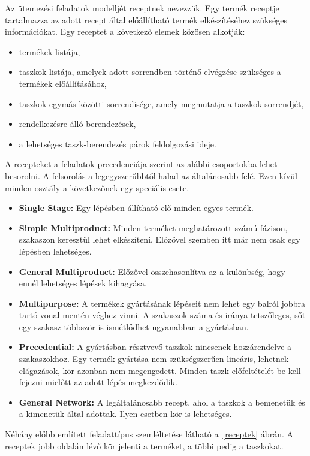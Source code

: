 Az ütemezési feladatok modelljét receptnek nevezzük. Egy termék receptje tartalmazza az adott recept által előállítható termék elkészítéséhez szükséges információkat\cite{Hegyhati}. Egy receptet a következő elemek közösen alkotják:
\begin{itemize}
  \item termékek listája,
  \item taszkok listája, amelyek adott sorrendben történő elvégzése szükséges a termékek előállításához,
  \item taszkok egymás közötti sorrendisége, amely megmutatja a taszkok sorrendjét,
  \item rendelkezésre álló berendezések,
  \item a lehetséges taszk-berendezés párok feldolgozási ideje.
\end{itemize}
A recepteket a feladatok precedenciája szerint az alábbi csoportokba lehet besorolni. A felsorolás a legegyszerűbbtől halad az általánosabb felé. Ezen kívül minden osztály a következőnek egy speciális esete.
\begin{itemize}
	\item \textbf{Single Stage:} Egy lépésben állítható elő minden egyes termék.
	\item \textbf{Simple Multiproduct:} Minden terméket meghatározott számú fázison, szakaszon keresztül lehet elkészíteni. Előzővel szemben itt már nem csak egy lépésben lehetséges.
	\item \textbf{General Multiproduct:} Előzővel összehasonlítva az a különbség, hogy ennél lehetséges lépések kihagyása.
	\item \textbf{Multipurpose:} A termékek gyártásának lépéseit nem lehet egy balról jobbra tartó vonal mentén véghez vinni. A szakaszok száma és iránya tetszőleges, sőt egy szakasz többször is ismétlődhet ugyanabban a gyártásban.
	\item \textbf{Precedential:} A gyártásban résztvevő taszkok nincsenek hozzárendelve a szakaszokhoz. Egy termék gyártása nem szükségszerűen lineáris, lehetnek elágazások, kör azonban nem megengedett. Minden taszk előfeltételét be kell fejezni mielőtt az adott lépés megkezdődik. 
	\item \textbf{General Network:} A legáltalánosabb recept, ahol a taszkok a bemenetük és a kimenetük által adottak. Ilyen esetben kör is lehetséges.
\end{itemize}
Néhány előbb említett feladattípus szemléltetése látható a~\ref{receptek} ábrán. A receptek jobb oldalán lévő kör jelenti a terméket, a többi pedig a taszkokat.
